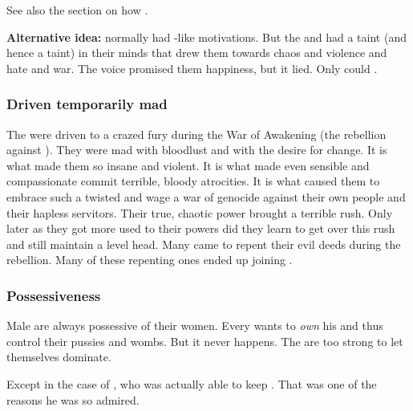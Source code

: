See also the section on how .

\textbf{Alternative idea:} 
\Resphain normally had \human-like motivations.
But the \satharioth and \ketherain had a \draconian taint (and hence a \xs taint) in their minds that drew them towards chaos and violence and hate and war. 
The voice promised them happiness, but it lied.
Only \dragons could . 






\subsubsection{Driven temporarily mad}
The \resphain were driven to a crazed fury during the War of Awakening (the rebellion against \Merkyrah).
They were mad with bloodlust and with the desire for change.
It is what made them so insane and violent.
It is what made even sensible and compassionate \resphain commit terrible, bloody atrocities.
It is what caused them to embrace such a twisted  and wage a war of genocide against their own people and their hapless servitors.
Their true, chaotic power brought a terrible rush.
Only later as they got more used to their powers did they learn to get over this rush and still maintain a level head.
Many came to repent their evil deeds during the rebellion.
Many of these repenting ones ended up joining \Kezerad.





\subsubsection{Possessiveness}
Male \resphain{} are always possessive of their women. 
Every \resphan{} wants to \emph{own} his \resviel{} and thus control their pussies and wombs. 
But it never happens. 
The \resviel{} are too strong to let themselves dominate. 

Except in the case of \Zachirah, who was actually able to keep . 
That was one of the reasons he was so admired. 





